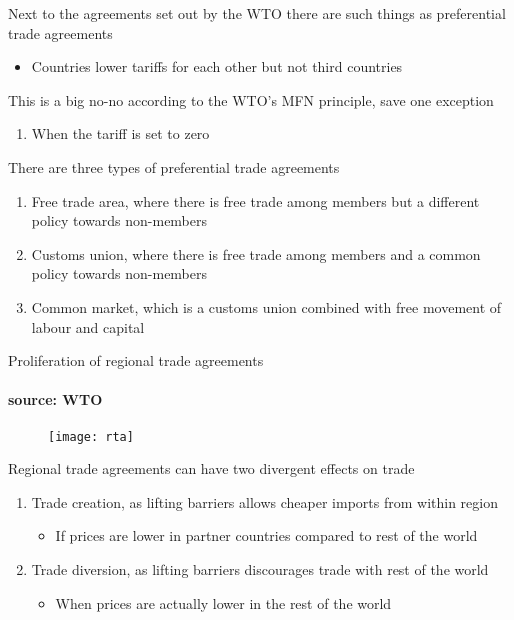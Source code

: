 \documentclass{beamer}
\begin{document}
\begin{frame}
 Next to the agreements set out by the WTO there are such things as preferential trade agreements
 \begin{itemize}
   \item Countries lower tariffs for each other but not third countries
 \end{itemize}
 \medskip
 This is a big no-no according to the WTO's MFN principle, save one exception
 \begin{enumerate}
   \item When the tariff is set to zero
 \end{enumerate}
\end{frame}

\begin{frame}  
  There are three types of preferential trade agreements
  \begin{enumerate}
    \item Free trade area, where there is free trade among members but a different policy towards non-members
    \item Customs union, where there is free trade among members and a common policy towards non-members
    \item Common market, which is a customs union combined with free movement of labour and capital
  \end{enumerate}
\end{frame}

\begin{frame}{Proliferation of regional trade agreements}
\framesubtitle{source: WTO}
  \begin{figure}
    \texttt{[image: rta]}
  \end{figure}
\end{frame}

\begin{frame}
  Regional trade agreements can have two divergent effects on trade
  \medskip
  \begin{enumerate}
    \item Trade creation, as lifting barriers allows cheaper imports from within region
    \begin{itemize}
      \item If prices are lower in partner countries compared to rest of the world      
    \end{itemize}
    \item Trade diversion, as lifting barriers discourages trade with rest of the world
    \begin{itemize}
      \item When prices are actually lower in the rest of the world
    \end{itemize}
  \end{enumerate}
\end{frame}
\end{document}
